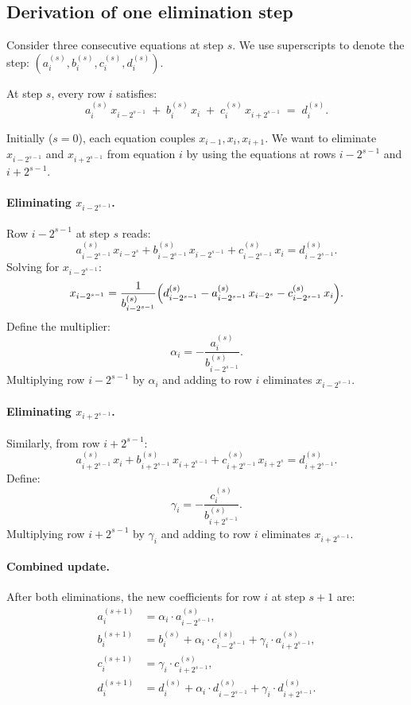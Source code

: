 \documentclass[11pt]{article}
\begin{document}
\subsection{Derivation of one elimination step}

Consider three consecutive equations at step $s$. We use superscripts to
denote the step: $(a_i^{(s)}, b_i^{(s)}, c_i^{(s)}, d_i^{(s)})$.

At step $s$, every row $i$ satisfies:
\begin{equation}\label{eq:step}
a_i^{(s)} \, x_{i - 2^{s-1}} \;+\; b_i^{(s)} \, x_i \;+\; c_i^{(s)} \, x_{i + 2^{s-1}} \;=\; d_i^{(s)}.
\end{equation}

Initially ($s=0$), each equation couples $x_{i-1}, x_i, x_{i+1}$.
We want to eliminate $x_{i-2^{s-1}}$ and $x_{i+2^{s-1}}$ from equation $i$
by using the equations at rows $i - 2^{s-1}$ and $i + 2^{s-1}$.

\paragraph{Eliminating $x_{i-2^{s-1}}$.}
Row $i - 2^{s-1}$ at step $s$ reads:
\[
a_{i-2^{s-1}}^{(s)} \, x_{i - 2^s} + b_{i-2^{s-1}}^{(s)} \, x_{i-2^{s-1}} + c_{i-2^{s-1}}^{(s)} \, x_i = d_{i-2^{s-1}}^{(s)}.
\]
Solving for $x_{i-2^{s-1}}$:
\[
x_{i-2^{s-1}} = \frac{1}{b_{i-2^{s-1}}^{(s)}} \Bigl( d_{i-2^{s-1}}^{(s)} - a_{i-2^{s-1}}^{(s)} \, x_{i-2^s} - c_{i-2^{s-1}}^{(s)} \, x_i \Bigr).
\]
Define the multiplier:
\[
\alpha_i = -\frac{a_i^{(s)}}{b_{i-2^{s-1}}^{(s)}}.
\]
Multiplying row $i - 2^{s-1}$ by $\alpha_i$ and adding to row $i$ eliminates $x_{i-2^{s-1}}$.

\paragraph{Eliminating $x_{i+2^{s-1}}$.}
Similarly, from row $i + 2^{s-1}$:
\[
a_{i+2^{s-1}}^{(s)} \, x_i + b_{i+2^{s-1}}^{(s)} \, x_{i+2^{s-1}} + c_{i+2^{s-1}}^{(s)} \, x_{i+2^s} = d_{i+2^{s-1}}^{(s)}.
\]
Define:
\[
\gamma_i = -\frac{c_i^{(s)}}{b_{i+2^{s-1}}^{(s)}}.
\]
Multiplying row $i + 2^{s-1}$ by $\gamma_i$ and adding to row $i$ eliminates $x_{i+2^{s-1}}$.

\paragraph{Combined update.}
After both eliminations, the new coefficients for row $i$ at step $s+1$ are:
\begin{align}
a_i^{(s+1)} &= \alpha_i \cdot a_{i-2^{s-1}}^{(s)}, \label{eq:update_a} \\
b_i^{(s+1)} &= b_i^{(s)} + \alpha_i \cdot c_{i-2^{s-1}}^{(s)} + \gamma_i \cdot a_{i+2^{s-1}}^{(s)}, \label{eq:update_b} \\
c_i^{(s+1)} &= \gamma_i \cdot c_{i+2^{s-1}}^{(s)}, \label{eq:update_c} \\
d_i^{(s+1)} &= d_i^{(s)} + \alpha_i \cdot d_{i-2^{s-1}}^{(s)} + \gamma_i \cdot d_{i+2^{s-1}}^{(s)}. \label{eq:update_d}
\end{align}
\end{document}
